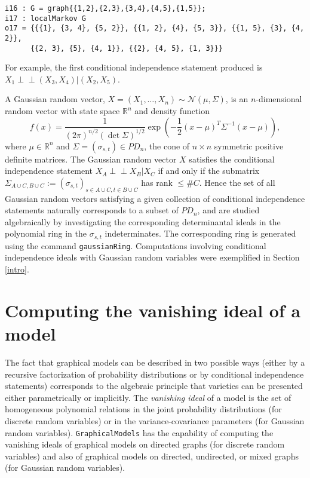 \documentclass[letterpaper]{article}
\theoremstyle{definition}
\def\ci{\perp\!\!\!\perp}
\begin{document}
\begin{verbatim}
i16 : G = graph{{1,2},{2,3},{3,4},{4,5},{1,5}};
i17 : localMarkov G
o17 = {{{1}, {3, 4}, {5, 2}}, {{1, 2}, {4}, {5, 3}}, {{1, 5}, {3}, {4, 2}}, 
      {{2, 3}, {5}, {4, 1}}, {{2}, {4, 5}, {1, 3}}}
\end{verbatim}

For example, the first conditional independence statement produced
is $X_{1} \ci (X_{3}, X_{4}) | (X_{2}, X_{5})$.

A Gaussian random vector, $X = (X_{1}, \ldots, X_{n}) 
\sim \mathcal{N}(\mu, \Sigma)$, is an
$n$-dimensional random vector with state space $\mathbb{R}^{n}$ and
density function
$$
f(x)  =  \frac{1}{(2 \pi)^{n/2}(\det \Sigma)^{1/2} } 
\exp\left( - \frac{1}{2} (x- \mu)^{T} \Sigma^{{-1}} (x - \mu) \right), 
$$
where $\mu \in \mathbb{R}^{n}$ and $\Sigma = (\sigma_{s,t}) \in PD_{n}$, the cone of 
$n \!\times\! n$ symmetric positive definite matrices.  The Gaussian random vector
$X$ satisfies the conditional independence statement $X_{A} \ci X_{B} | X_{C}$
if and only if the submatrix 
$\Sigma_{A \cup C, B \cup C}  := 
(\sigma_{s,t})_{s \in A \cup C, t \in B \cup C}$ has rank $\leq \#C$.
Hence the set of all Gaussian random vectors satisfying a given
collection of conditional independence statements naturally corresponds
to a subset of $PD_{n}$, and are studied algebraically by investigating  the 
corresponding determinantal ideals in the polynomial ring
in the $\sigma_{s,t}$ indeterminates.  The corresponding ring
is generated using the command {\tt gaussianRing}.
Computations involving conditional independence ideals with
Gaussian random variables were exemplified in Section \ref{intro}. 



\section{Computing the vanishing ideal of a model}

The fact that graphical models can be described in two possible ways (either by a recursive
factorization of probability distributions or by conditional independence
statements) corresponds to the algebraic principle that varieties can be presented either
parametrically or implicitly. The \emph{vanishing ideal} of a model is the set
of homogeneous polynomial relations in the joint probability distributions (for discrete
random variables) or in the variance-covariance parameters (for Gaussian
random variables).
{\tt GraphicalModels} has the capability of computing the vanishing ideals
of graphical models on directed graphs (for discrete random variables) and also
of graphical models on directed, undirected, or  mixed
graphs (for Gaussian random variables).
\end{document}
